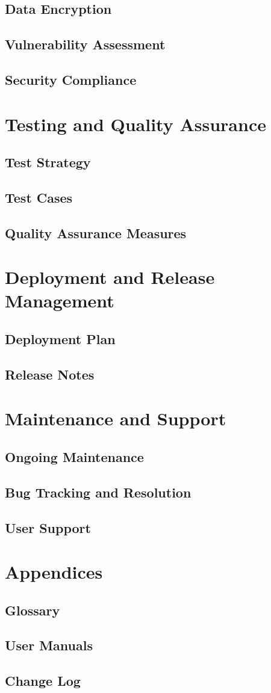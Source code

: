 \documentclass{article}
\begin{document}
   \subsection{Data Encryption}
   \subsection{Vulnerability Assessment}
   \subsection{Security Compliance}

\section{Testing and Quality Assurance}
   \subsection{Test Strategy}
   \subsection{Test Cases}
   \subsection{Quality Assurance Measures}

\section{Deployment and Release Management}
   \subsection{Deployment Plan}
   \subsection{Release Notes}

\section{Maintenance and Support}
   \subsection{Ongoing Maintenance}
   \subsection{Bug Tracking and Resolution}
   \subsection{User Support}

\section{Appendices}
   \subsection{Glossary}
   \subsection{User Manuals}
   \subsection{Change Log}
\end{document}
